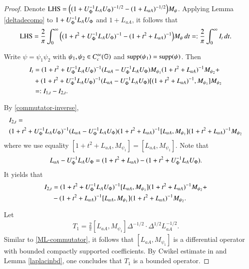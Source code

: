 \documentclass[leqno]{amsart}
\begin{document}
	\begin{proof}
		Denote ${\rm LHS}=\Big((1+U_{\Phi}^{-1}{L_{A}} U_{\Phi})^{-1/2}-(1+ L_{aA})^{-1/2}\Big)M_{\psi}$. 
		Applying Lemma \ref{deltadecomo} to $1+U_{\Phi}^{-1}{L_{A}} U_{\Phi}$ and $1+ L_{aA}$, it follows that
		\begin{align*}
			{\rm LHS}
			=\frac{2}{\pi}\int_{0}^{\infty}\Big((1+t^{2}+U_{\Phi}^{-1}{L_{A}} U_{\Phi})^{-1}-(1+t^{2}+ L_{aA})^{-1}\Big)M_{\psi}\,dt
			=:\frac{2}{\pi}\int_{0}^{\infty}I_{t}\,dt.
		\end{align*}
		
		Write $\psi=\psi_{1}\psi_{2}$ with $\psi_{1},\psi_{2}\in C_{c}^{\infty}(\mathbb{G})$ and ${\rm supp}(\psi_{1})={\rm supp}(\psi)$. 
		Then
		\begin{align}\label{equalityo}
			\nonumber I_{t}&=(1+t^{2}+U_{\Phi}^{-1}{L_{A}} U_{\Phi})^{-1}( L_{aA}-U_{\Phi}^{-1}{L_{A}} U_{\Phi})M_{\psi_{1}}(1+t^{2}+ L_{aA})^{-1}M_{\psi_{2}}+\\
			\nonumber&+(1+t^{2}+U_{\Phi}^{-1}{L_{A}} U_{\Phi})^{-1}( L_{aA}-U_{\Phi}^{-1}{L_{A}} U_{\Phi})[(1+t^{2}+ L_{aA})^{-1},M_{\psi_{1}}]M_{\psi_{2}}\\
			&=:I_{1,t}-I_{2,t}.
		\end{align}
		
		By \eqref{commutator-inverse},
		\begin{align*}
			&I_{2,t}=\\
			&(1+t^{2}+U_{\Phi}^{-1}{L_{A}} U_{\Phi})^{-1}( L_{aA}-U_{\Phi}^{-1}{L_{A}} U_{\Phi})(1+t^{2}+ L_{aA})^{-1}[ L_{aA},M_{\psi_{1}}](1+t^{2}+ L_{aA})^{-1}M_{\psi_{2}}
		\end{align*}
		where we use equality $[1+t^{2}+ L_{aA},M_{\psi_{1}}]=[ L_{aA},M_{\psi_{1}}]$.
		Note that
		$$ L_{aA}-U_{\Phi}^{-1}{L_{A}} U_{\Phi}=(1+t^{2}+ L_{aA})-(1+t^{2}+U_{\Phi}^{-1}{L_{A}} U_{\Phi}).$$
		It yields that
		\begin{align}\label{equalityt}
			\nonumber I_{2,t}&=(1+t^{2}+U_{\Phi}^{-1}{L_{A}} U_{\Phi})^{-1}[ L_{aA},M_{\psi_{1}}](1+t^{2}+ L_{aA})^{-1}M_{\psi_{2}}+\\
			&-(1+t^{2}+ L_{aA})^{-1}[ L_{aA},M_{\psi_{1}}](1+t^{2}+ L_{aA})^{-1}M_{\psi_{2}}.
		\end{align}
		
		Let
		\begin{align}\label{T1-bd}
			T_{1}=\frac{2}{\pi}[ L_{aA},M_{\psi_{1}}]\Delta^{-1/2}\cdot 
			\Delta^{1/2} L_{aA}^{-1/2}.
		\end{align}
		Similar to \eqref{ML-commutator}, it follows that $[ L_{aA},M_{\psi_{1}}]$ is a differential operator with bounded compactly supported coefficients. By Cwikel estimate in \cite{MSZ-Cwikel} and Lemma \ref{laplacinbd}, one concludes that $T_{1}$ is a bounded operator.
		

\end{proof}
\end{document}
